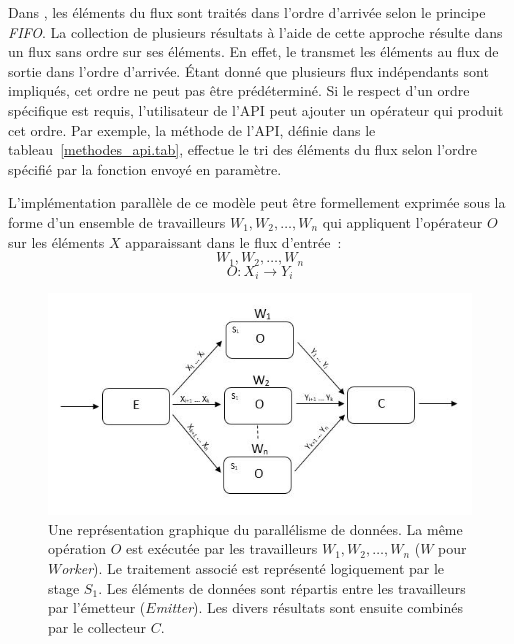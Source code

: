 Dans , les \'el\'ements du flux sont trait\'es dans l'ordre d'arriv\'ee selon le principe \emph{FIFO}. La collection de plusieurs r\'esultats \`a l'aide de cette approche r\'esulte dans un flux sans ordre sur ses \'el\'ements. En effet, le  transmet les \'el\'ements au flux de sortie dans l'ordre d'arriv\'ee. \'Etant donn\'e que plusieurs flux ind\'ependants sont impliqu\'es, cet ordre ne peut pas \^etre pr\'ed\'etermin\'e. Si le respect d'un  ordre sp\'ecifique est requis, l'utilisateur de l'API peut ajouter un op\'erateur qui produit cet ordre. Par exemple, la m\'ethode  de l'API, d\'efinie dans le tableau~\ref{methodes_api.tab}, effectue le tri des \'el\'ements du flux selon l'ordre sp\'ecifi\'e par la fonction  envoy\'e en param\`etre.

\goodbreak
%
\begin{samepage}
L'impl\'ementation parall\`ele de ce mod\`ele peut \^etre formellement
exprim\'ee sous la forme d'un ensemble de travailleurs $W_1, W_2,\ldots, W_n$ qui
appliquent l'op\'erateur $O$ sur les \'el\'ements $X$ apparaissant dans
le flux d'entr\'ee~:
%
\[
	W_1, W_2,\ldots, W_n
\]
%
\[
	O : X_i \rightarrow Y_i
\]
\end{samepage}

\begin{figure}[ht]
\centering
     \includegraphics[width=1.0\textwidth]{Figures/DataParallelisme.jpg}
      \caption[Une repr\'esentation graphique du parall\'elisme de donn\'ees.]{Une repr\'esentation graphique du parall\'elisme de donn\'ees. La m\^eme op\'eration $O$ est ex\'ecut\'ee par les travailleurs $W_1, W_2,\ldots, W_n$ ($W$ pour \emph{$W$orker}). Le traitement associ\'e est repr\'esent\'e logiquement par le stage $S_1$. Les \'el\'ements de donn\'ees sont r\'epartis entre les travailleurs par l'\'emetteur ($E$\emph{mitter}). Les divers r\'esultats sont ensuite combin\'es par le collecteur $C$.}
       \label{DataParallelisme.fig}
\end{figure}


